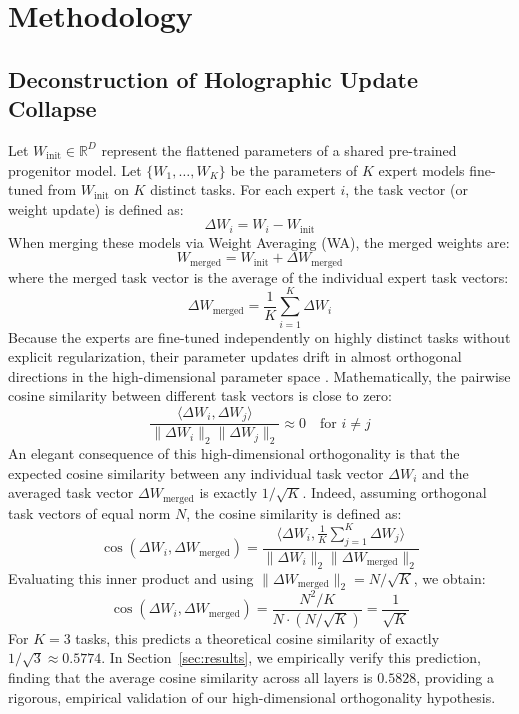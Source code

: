 \documentclass{article}
\theoremstyle{plain}
\theoremstyle{definition}
\theoremstyle{remark}
\begin{document}
\section{Methodology}
\label{sec:method}

\subsection{Deconstruction of Holographic Update Collapse}
Let $W_{\text{init}} \in \mathbb{R}^{D}$ represent the flattened parameters of a shared pre-trained progenitor model. Let $\{W_1, \dots, W_K\}$ be the parameters of $K$ expert models fine-tuned from $W_{\text{init}}$ on $K$ distinct tasks. For each expert $i$, the task vector (or weight update) is defined as:
\begin{equation}
  \Delta W_i = W_i - W_{\text{init}}
\end{equation}
When merging these models via Weight Averaging (WA), the merged weights are:
\begin{equation}
  W_{\text{merged}} = W_{\text{init}} + \Delta W_{\text{merged}}
\end{equation}
where the merged task vector is the average of the individual expert task vectors:
\begin{equation}
  \Delta W_{\text{merged}} = \frac{1}{K} \sum_{i=1}^K \Delta W_i
\end{equation}
Because the experts are fine-tuned independently on highly distinct tasks without explicit regularization, their parameter updates drift in almost orthogonal directions in the high-dimensional parameter space \cite{choshen22, jin23regmean}. Mathematically, the pairwise cosine similarity between different task vectors is close to zero:
\begin{equation}
  \frac{\langle \Delta W_i, \Delta W_j \rangle}{\|\Delta W_i\|_2 \|\Delta W_j\|_2} \approx 0 \quad \text{for } i \neq j
\end{equation}
An elegant consequence of this high-dimensional orthogonality is that the expected cosine similarity between any individual task vector $\Delta W_i$ and the averaged task vector $\Delta W_{\text{merged}}$ is exactly $1/\sqrt{K}$. Indeed, assuming orthogonal task vectors of equal norm $N$, the cosine similarity is defined as:
\begin{equation}
  \cos(\Delta W_i, \Delta W_{\text{merged}}) = \frac{\langle \Delta W_i, \frac{1}{K}\sum_{j=1}^K \Delta W_j \rangle}{\|\Delta W_i\|_2 \|\Delta W_{\text{merged}}\|_2} 
\end{equation}
Evaluating this inner product and using $\|\Delta W_{\text{merged}}\|_2 = N/\sqrt{K}$, we obtain:
\begin{equation}
  \cos(\Delta W_i, \Delta W_{\text{merged}}) = \frac{N^2 / K}{N \cdot (N / \sqrt{K})} = \frac{1}{\sqrt{K}}
\end{equation}
For $K=3$ tasks, this predicts a theoretical cosine similarity of exactly $1/\sqrt{3} \approx 0.5774$. In Section~\ref{sec:results}, we empirically verify this prediction, finding that the average cosine similarity across all layers is $0.5828$, providing a rigorous, empirical validation of our high-dimensional orthogonality hypothesis.
\end{document}
